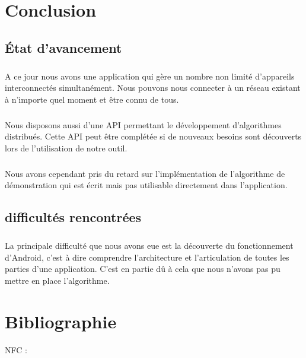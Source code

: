 \documentclass[a4paper,10pt]{report}
\begin{document}
\chapter{Conclusion}
\section{État d'avancement}
\paragraph{}
A ce jour nous avons une application qui gère un nombre non limité d'appareils interconnectés simultanément. Nous pouvons nous connecter à un réseau existant à n'importe quel moment et être connu de tous.
\paragraph{}
Nous disposons aussi d'une API permettant le développement d'algorithmes distribués. Cette API peut être complétée si de nouveaux besoins sont découverts lors de l'utilisation de notre outil.
\paragraph{}
Nous avons cependant pris du retard sur l'implémentation de l'algorithme de démonstration qui est écrit mais pas utilisable directement dans l'application.
\paragraph{}
\section{difficultés rencontrées}
\paragraph{}
La principale difficulté que nous avons eue est la découverte du fonctionnement d'Android, c'est à dire comprendre l'architecture et l'articulation de toutes les parties d'une application. C'est en partie dû à cela que nous n'avons pas pu mettre en place l'algorithme.
\newpage
\listoffigures  %
\chapter*{Bibliographie}
\sloppy
 NFC :
 
\end{document}
